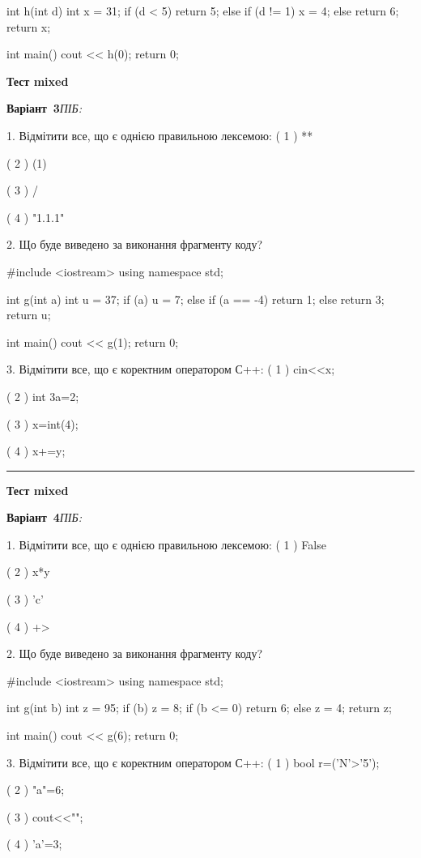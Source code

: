 \documentclass[11pt]{article}
\begin{document}
int h(int d){
    int x = 31;
    if (d < 5) 
        return 5;
    else if (d != 1)
         x = 4;
    else
         return 6;
    return x;
}

int main(){
    cout << h(0);
    return 0;
}





\newpage
{\large\textbf{Тест mixed}}

\textbf{Варіант \No\,3}\hfill \textit{ПІБ:}\,\underline{\hspace{60mm}}
\vspace{4mm}

1. Відмітити все, що є однією правильною лексемою:
( 1 ) **

( 2 ) (1)

( 3 ) /

( 4 ) "1.1.1"

2. Що буде виведено за виконання фрагменту коду?

#include <iostream>
using namespace std;

int g(int a){
    int u = 37;
    if (a) 
        u = 7;
    else if (a == -4)
         return 1;
    else
         return 3;
    return u;
}

int main(){
    cout << g(1);
    return 0;
}


3. Відмітити все, що є коректним оператором С++:
( 1 ) cin<<x;

( 2 ) int 3a=2;

( 3 ) x=int(4);

( 4 ) x+=y;




\vspace{10mm}
\noindent\rule{\textwidth}{0.3pt}
\vspace{8mm}
{\large\textbf{Тест mixed}}

\textbf{Варіант \No\,4}\hfill \textit{ПІБ:}\,\underline{\hspace{60mm}}
\vspace{4mm}

1. Відмітити все, що є однією правильною лексемою:
( 1 ) False

( 2 ) x*y

( 3 ) 'c'

( 4 ) +>

2. Що буде виведено за виконання фрагменту коду?

#include <iostream>
using namespace std;

int g(int b){
    int z = 95;
    if (b) 
        z = 8;
    if (b <= 0)
         return 6;
    else
         z = 4;
    return z;
}

int main(){
    cout << g(6);
    return 0;
}


3. Відмітити все, що є коректним оператором С++:
( 1 ) bool r=('N'>'5');

( 2 ) "a"=6;

( 3 ) cout<<"\n";

( 4 ) 'a'=3;




\newpage
\end{document}

